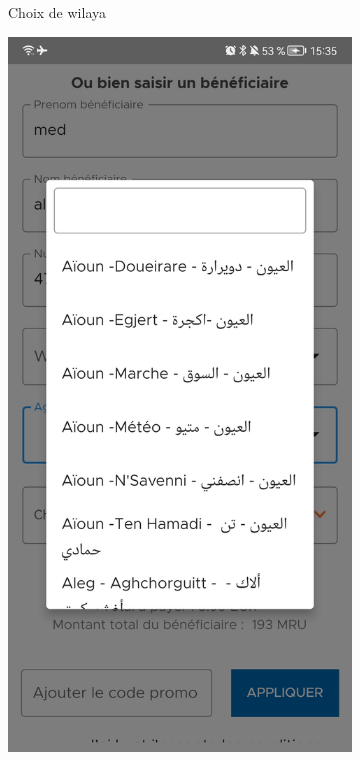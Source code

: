 \begin{itemize}[label=$\ast$]
\begin{figure}
\begin{subfigure}[b]{0.3\textwidth}
		\caption{Choix de wilaya}
		\label{fig:five over x}
	\end{subfigure}
	\newline
		\centering
	\begin{subfigure}[b]{0.3\textwidth}
		\centering
		\includegraphics[width=\textwidth]{./Template LaTeX/Images/13.jpg}

\end{subfigure}
\end{figure}
\end{itemize}
